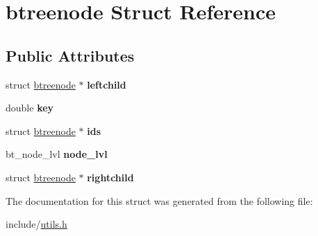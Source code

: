 \hypertarget{structbtreenode}{\section{btreenode Struct Reference}
\label{structbtreenode}
}
\subsection*{Public Attributes}
\begin{DoxyCompactItemize}
\item 
\hypertarget{structbtreenode_a1f227ad87c3b92024e321cafd3db0822}{struct \hyperlink{structbtreenode}{btreenode} $\ast$ {\bfseries leftchild}}\label{structbtreenode_a1f227ad87c3b92024e321cafd3db0822}

\item 
\hypertarget{structbtreenode_a60f21170951dbc9ab3d0b6ecee0370ba}{double {\bfseries key}}\label{structbtreenode_a60f21170951dbc9ab3d0b6ecee0370ba}

\item 
\hypertarget{structbtreenode_aa5b32869e473af703dc65c719fc97dfb}{struct \hyperlink{structbtreenode}{btreenode} $\ast$ {\bfseries ids}}\label{structbtreenode_aa5b32869e473af703dc65c719fc97dfb}

\item 
\hypertarget{structbtreenode_a584c7eacec66905978cda53ff3caf8e0}{bt\+\_\+node\+\_\+lvl {\bfseries node\+\_\+lvl}}\label{structbtreenode_a584c7eacec66905978cda53ff3caf8e0}

\item 
\hypertarget{structbtreenode_ad9be8bd383cd8140ded5a7b881682aa9}{struct \hyperlink{structbtreenode}{btreenode} $\ast$ {\bfseries rightchild}}\label{structbtreenode_ad9be8bd383cd8140ded5a7b881682aa9}

\end{DoxyCompactItemize}


The documentation for this struct was generated from the following file\+:\begin{DoxyCompactItemize}
\item 
include/\hyperlink{utils_8h}{utils.\+h}\end{DoxyCompactItemize}
